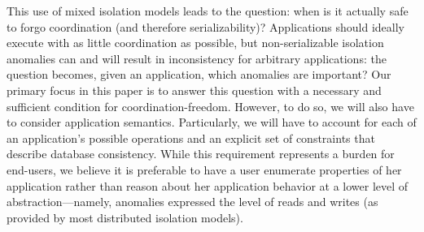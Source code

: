 This use of mixed isolation models leads to the question: when is it
actually safe to forgo coordination (and therefore serializability)?
Applications should ideally execute with as little coordination as
possible, but non-serializable isolation anomalies can and will result
in inconsistency for arbitrary applications: the question becomes,
given an application, which anomalies are important? Our primary focus
in this paper is to answer this question with a necessary and
sufficient condition for coordination-freedom. However, to do so, we
will also have to consider application semantics. Particularly, we
will have to account for each of an application's possible operations
and an explicit set of constraints that describe database
consistency. While this requirement represents a burden for end-users,
we believe it is preferable to have a user enumerate properties of her
application rather than reason about her application behavior at a
lower level of abstraction---namely, anomalies expressed the level of
reads and writes (as provided by most distributed isolation models).


